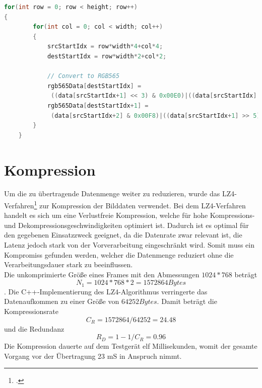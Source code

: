 \begin{lstlisting}[caption=Umwandlung des Pixelformates, label=lst:rgb_conversion, language=C++]
for(int row = 0; row < height; row++)
{
        for(int col = 0; col < width; col++)
        {
            srcStartIdx = row*width*4+col*4;
            destStartIdx = row*width*2+col*2;

            // Convert to RGB565
            rgb565Data[destStartIdx] =
             ((data[srcStartIdx+1] << 3) & 0x00E0)|((data[srcStartIdx] >> 3) & 0x001F);
            rgb565Data[destStartIdx+1] = 
             (data[srcStartIdx+2] & 0x00F8)|((data[srcStartIdx+1] >> 5) & 0x0007);
        }
    }
\end{lstlisting}

\section{Kompression}
Um die zu übertragende Datenmenge weiter zu reduzieren, wurde das LZ4-Verfahren\footcite{LZ4} zur Kompression der Bilddaten verwendet. Bei dem LZ4-Verfahren handelt es sich um eine Verlustfreie Kompression, welche für hohe Kompressions- und Dekompressionsgeschwindigkeiten optimiert ist. Dadurch ist es optimal für den gegebenen Einsatzzweck geeignet, da die Datenrate zwar relevant ist, die Latenz jedoch stark von der Vorverarbeitung eingeschränkt wird. Somit muss ein Kompromiss gefunden werden, welcher die Datenmenge reduziert ohne die Verarbeitungsdauer stark zu beeinflussen. \\
Die unkomprimierte Größe eines Frames mit den Abmessungen $1024*768$ beträgt
\begin{equation}
N_1=1024*768*2=1572864 Bytes
\end{equation}.
Die C++-Implementierung des LZ4-Algorithmus verringerte das Datenaufkommen zu einer Größe von $64252 Bytes$. Damit beträgt die Kompressionsrate 
\begin{equation}
C_R=1572864/64252=24.48
\end{equation}
und die Redundanz
\begin{equation}
R_D=1-1/C_R=0.96
\end{equation}
Die Kompression dauerte auf dem Testgerät elf Millisekunden, womit der gesamte Vorgang vor der Übertragung 23 mS in Anspruch nimmt.\\



